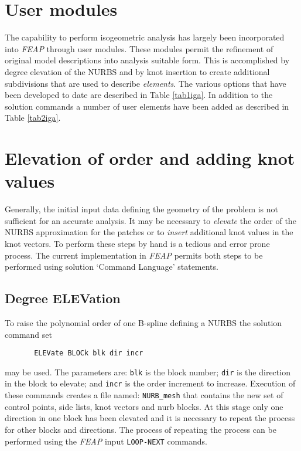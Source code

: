 \section{User modules}

The capability to perform isogeometric analysis has largely been incorporated
into \textsl{FEAP} through user modules.  These modules permit the refinement
of original model descriptions into analysis suitable form.  This is accomplished
by degree elevation of the NURBS and by knot insertion to create additional
subdivisions that are used to describe \textit{elements}.  The various
options that have been developed to date are described in Table \ref{tab1iga}.
In addition to the solution commands a number of user elements have been
added as described in Table \ref{tab2iga}.



\section{Elevation of order and adding knot values}

Generally, the initial input data defining the geometry of the problem is not
sufficient for an accurate analysis.  It may be necessary to \textit{elevate}
the order of the NURBS approximation for the patches or to \textit{insert}
additional knot values in the knot vectors.  To perform these steps by hand
is a tedious and error prone process.  The current implementation in
\textsl{FEAP} permits both steps to be performed using solution `Command
Language' statements.

\subsection{Degree ELEVation}

To raise the polynomial order of one B-spline defining a NURBS the
solution command set
\begin{verbatim}
       ELEVate BLOCk blk dir incr
\end{verbatim}
may be used.  The parameters are: \texttt{blk} is the block number;
\texttt{dir} is the direction in the block to elevate; and \texttt{incr} is
the order increment to increase.  Execution of these commands creates a
file named: \texttt{NURB\_mesh} that contains the new set of control points,
side lists, knot vectors and nurb blocks.  At this stage only one direction
in one block has been elevated and it is necessary to repeat the process for
other blocks and directions.  The process of repeating the process can be
performed using the \textsl{FEAP} input \texttt{LOOP-NEXT} commands.

